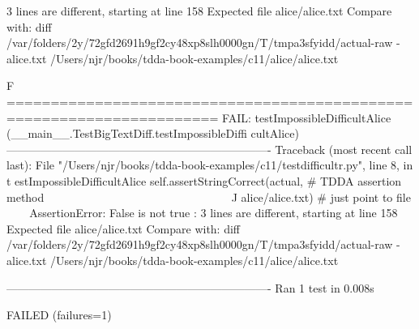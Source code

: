 3 lines are different, starting at line 158
Expected file alice/alice.txt
Compare with:
    diff /var/folders/2y/72gfd2691h9gf2cy48xp8slh0000gn/T/tmpa3sfyidd/actual-raw
-alice.txt /Users/njr/books/tdda-book-examples/c11/alice/alice.txt

F
======================================================================
FAIL: testImpossibleDifficultAlice (__main__.TestBigTextDiff.testImpossibleDiffi
cultAlice)
----------------------------------------------------------------------
Traceback (most recent call last):
  File "/Users/njr/books/tdda-book-examples/c11/testdifficultr.py", line 8, in t
estImpossibleDifficultAlice
    self.assertStringCorrect(actual,                # TDDA assertion method
    ~~~~~~~~~~~~~~~~~~~~~~~~^^^^^^^^^^^^^^^^^^^^^^^^^^^^^^^^^^^^^^^^^^^^^^^
                             \textquotesingle{}alice/alice.txt\textquotesingle{})     # just point to file
                             ^^^^^^^^^^^^^^^^^^
AssertionError: False is not true : 3 lines are different, starting at line 158
Expected file alice/alice.txt
Compare with:
    diff /var/folders/2y/72gfd2691h9gf2cy48xp8slh0000gn/T/tmpa3sfyidd/actual-raw
-alice.txt /Users/njr/books/tdda-book-examples/c11/alice/alice.txt


----------------------------------------------------------------------
Ran 1 test in 0.008s

FAILED (failures=1)
